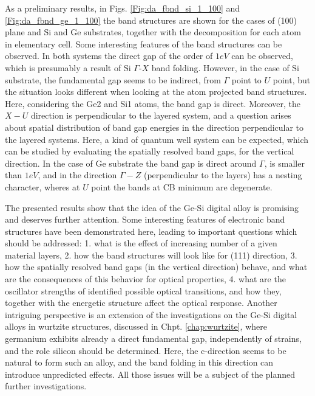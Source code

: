 As a preliminary results, in Figs. \ref{Fig:da_fbnd_si_1_100} and \ref{Fig:da_fbnd_ge_1_100} the band structures are shown for the cases of (100) plane and Si and Ge substrates, together with the decomposition for each atom in elementary cell. Some interesting features of the band structures can be observed. In both systems the direct gap of the order of $1eV$ can be observed, which is presumably a result of  Si $\Gamma$-$X$ band folding. However, in the case of Si substrate, the fundamental gap seems to be indirect, from $\Gamma$ point to $U$ point, but the situation looks different when looking at the atom projected band structures. Here, considering the Ge2 and Si1 atoms, the band gap is direct. Moreover, the $X-U$ direction is perpendicular to the layered system, and a question arises about spatial distribution of band gap energies in the direction perpendicular to the layered systems. Here, a kind of quantum well system can be expected, which can be studied by evaluating the spatially resolved band gaps, for the vertical direction. In the case of Ge substrate the band gap is direct around $\Gamma$, is smaller than $1eV$, and in the direction $\Gamma-Z$ (perpendicular to the layers) has a nesting character, wheres at $U$ point the bands at CB minimum are degenerate. 

The presented results show that the idea of the Ge-Si digital alloy is promising and deserves further attention.  Some interesting features of electronic band structures have been demonstrated here, leading to important questions which should be addressed: 1. what is the effect of increasing number of a given material layers, 2. how the band structures will look like for (111) direction, 3. how the spatially resolved band gaps (in the  vertical direction) behave, and what are the consequences of this behavior for optical properties, 4. what are the oscillator strengths of identified possible optical transitions, and how they, together with the energetic structure affect the optical response. Another intriguing  perspective is an extension of the  investigations on the Ge-Si digital alloys in wurtzite structures, discussed in Chpt. \ref{chap:wurtzite}, where germanium exhibits already a direct fundamental gap, independently of strains, and the role silicon should be determined. Here, the c-direction seems to be natural to form such an alloy, and the band folding in this direction can introduce unpredicted effects. All those issues will be a subject of the planned further investigations.

\ornament